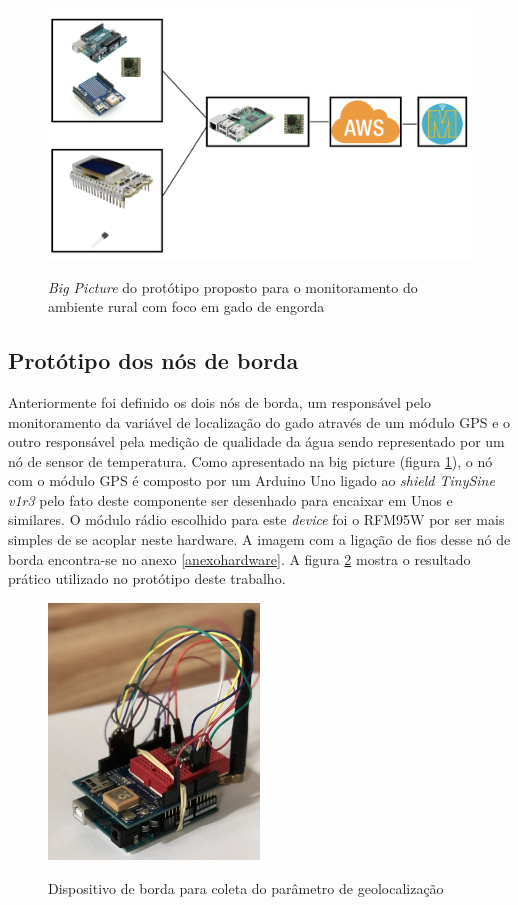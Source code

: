\documentclass[
    hidelinks,
	12pt,				%
	openany,
	oneside, 
	a4paper,			%
	english,			%
	french,				%
	spanish,			%
	brazil				%
	]{abntex2}
\begin{document}
\begin{figure}[ht]
    \centering   
    \caption{\textit{Big Picture} do protótipo proposto para o monitoramento do ambiente rural com foco em gado de engorda}
    \includegraphics[width=1\textwidth]{bigpictureprototipomannaware.png}
    \label{fig:bigpicprototipo}
\end{figure}

\subsection{Protótipo dos nós de borda}

Anteriormente foi definido os dois nós de borda, um responsável pelo monitoramento da variável de localização do gado através de um módulo GPS e o outro responsável pela medição de qualidade da água sendo representado por um nó de sensor de temperatura. Como apresentado na big picture (figura \ref{fig:bigpicprototipo}), o nó com o módulo GPS é composto por um Arduino Uno ligado ao \textit{shield TinySine v1r3} pelo fato deste componente ser desenhado para encaixar em Unos e similares. O módulo rádio escolhido para este \textit{device} foi o RFM95W por ser mais simples de se acoplar neste hardware. A imagem com a ligação de fios desse nó de borda encontra-se no anexo \ref{anexohardware}. A figura \ref{fig:gps1} mostra o resultado prático utilizado no protótipo deste trabalho.

\begin{figure}[ht]
    \centering
    \caption{Dispositivo de borda para coleta do parâmetro de geolocalização}
    \includegraphics[width=0.5\textwidth]{gps1.png}
    \label{fig:gps1}
\end{figure}
\end{document}
